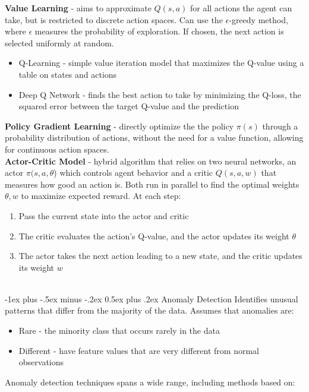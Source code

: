 \documentclass[10pt,landscape]{article}
\makeatletter
\renewcommand{\section}{\@startsection{section}{1}{0mm}%
                                {-1ex plus -.5ex minus -.2ex}%
                                {0.5ex plus .2ex}%
                                {\normalfont\large\bfseries}}
\makeatother
\begin{document}
\begin{multicols}{3}
    \textbf{Value Learning} - aims to approximate $Q(s,a)$ for all actions the agent can take, but is restricted to discrete action spaces. Can use the $\epsilon$-greedy method, where $\epsilon$ measures the probability of exploration. If chosen, the next action is selected uniformly at random.
    \begin{itemize}[label={--},leftmargin=4mm]
        \itemsep -.4mm
        \item Q-Learning - simple value iteration model that maximizes the Q-value using a table on states and actions
        \item Deep Q Network - finds the best action to take by minimizing the Q-loss, the squared error between the target Q-value and the prediction
    \end{itemize}

    \textbf{Policy Gradient Learning} - directly optimize the the policy $\pi(s)$ through a probability distribution of actions, without the need for a value function, allowing for continuous action spaces.  \\
    \smallskip
    \textbf{Actor-Critic Model} - hybrid algorithm that relies on two neural networks, an actor $\pi(s,a,\theta$) which controls agent behavior  and a critic $Q(s,a,w)$ that measures how good an action is. Both run in parallel to find the optimal weights $\theta, w$ to maximize expected reward. At each step:
        \begin{enumerate}[leftmargin=5mm]
            \itemsep -.4mm
            \item Pass the current state into the actor and critic
            \item The critic evaluates the action's Q-value, and the actor updates its weight $\theta$
            \item The actor takes the next action leading to a new state, and the critic updates its weight $w$
        \end{enumerate}

        \textcolor{white}{.}\vspace{-4mm}\\ %
        \section{Anomaly Detection}
        Identifies unusual patterns that differ from the majority of the data. Assumes that anomalies are:
        \begin{itemize}[label={--},leftmargin=4mm]
            \itemsep -.4mm
            \item Rare - the minority class that occurs rarely in the data
            \item Different - have feature values that are very different from normal observations
        \end{itemize}
        Anomaly detection techniques spans a wide range, including methods based on:


\end{multicols}
\end{document}
